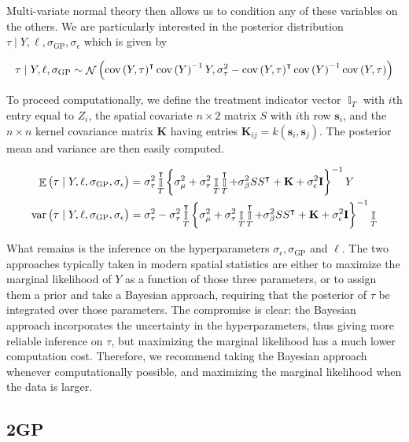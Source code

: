\documentclass[letter]{article}
\DeclareMathOperator{\E}{\mathbb{E}}
\DeclareMathOperator{\cov}{{cov}}
\DeclareMathOperator{\var}{{var}}
\DeclareMathOperator{\Ind}{\mathbb{I}}
\DeclareMathOperator{\normal}{\mathcal{N}}
\newcommand{\trans}{^{\intercal}}
\newcommand{\sigmaf}{\sigma_{\mathrm{GP}}}
\newcommand{\sigman}{\sigma_{\epsilon}}
\newcommand{\sigmatau}{\sigma_{\tau}}
\newcommand{\sigmabeta}{\sigma_{\beta}}
\newcommand{\sigmamu}{\sigma_{\mu}}
\newcommand{\svec}{\mathbold{s}}
\newcommand{\vectreat}{\Ind_{T}}
\newcommand{\eye}{\mathbf{I}}
\newcommand{\K}{\mathbf{K}}
\begin{document}
Multi-variate normal theory then allows us to condition any of these variables on the others. We are particularly interested in the posterior distribution \(\tau \mid Y, \ell, \sigmaf, \sigman\) which is given by

\begin{equation}
    \tau \mid Y, \ell, \sigmaf \sim \normal\del{\cov\del{Y,\tau}\trans \cov\del{Y}^{-1} Y, \sigma_\tau^2 - \cov\del{Y,\tau}\trans \cov\del{Y}^{-1} \cov\del{Y,\tau}}
\end{equation}

To proceed computationally, we define the treatment indicator vector \(\vectreat\) with \(i\)th entry equal to \(Z_i\), the spatial covariate \(n \times 2\) matrix \(S\) with \(i\)th row \(\svec_i\), and the \(n \times n\) kernel covariance matrix \(\K\) having entries \(\K_{ij}=k(\svec_i, \svec_j)\). The posterior mean and variance are then easily computed.

\begin{equation}\begin{split}
    \E \del{\tau \mid Y, \ell, \sigmaf, \sigman} &= \sigmatau^2 \vectreat\trans \cbr{\sigmamu^2 + \sigmatau^2 \vectreat \vectreat\trans + \sigmabeta^2 S S\trans + \K + \sigman^2 \eye }^{-1} Y \\
    \var \del{\tau \mid Y, \ell, \sigmaf, \sigman} &= \sigma_\tau^2 - \sigma_\tau^2 \vectreat\trans \cbr{\sigmamu^2 + \sigmatau^2 \vectreat \vectreat\trans + \sigmabeta^2 S S\trans + \K + \sigman^2 \eye }^{-1} \vectreat
\end{split}\end{equation}

What remains is the inference on the hyperparameters \(\sigman, \sigmaf\) and \(\ell\). The two approaches typically taken in modern spatial statistics are either to maximize the marginal likelihood of \(Y\) as a function of those three parameters, or to assign them a prior and take a Bayesian approach, requiring that the posterior of \(\tau\) be integrated over those parameters. The compromise is clear: the Bayesian approach incorporates the uncertainty in the hyperparameters, thus giving more reliable inference on \(\tau\), but maximizing the marginal likelihood has a much lower computation cost. Therefore, we recommend taking the Bayesian approach whenever computationally possible, and maximizing the marginal likelihood when the data is larger.
    


    	\subsection{2GP}\label{gp}
\end{document}
